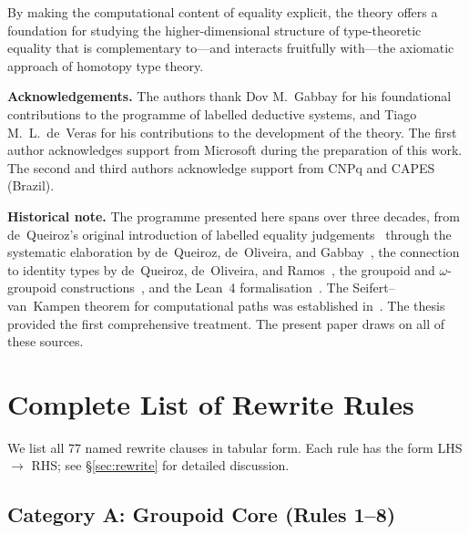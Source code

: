 \documentclass[manuscript]{BSLstyle}
\begin{document}
By making the computational content of equality explicit, the theory
offers a foundation for studying the higher-dimensional structure of
type-theoretic equality that is complementary to---and interacts
fruitfully with---the axiomatic approach of homotopy type theory.

\bigskip

\noindent
\textbf{Acknowledgements.}
The authors thank Dov M.~Gabbay for his foundational contributions to
the programme of labelled deductive systems, and Tiago M.~L.~de~Veras
for his contributions to the development of the theory.  The first
author acknowledges support from Microsoft during the preparation of
this work.  The second and third authors acknowledge support from
CNPq and CAPES (Brazil).

\bigskip

\noindent\textbf{Historical note.}
The programme presented here spans over three decades, from
de~Queiroz's original introduction of labelled equality
judgements~\cite{deQueiroz88:dialectica} through the systematic
elaboration by de~Queiroz, de~Oliveira, and
Gabbay~\cite{GabbaydeQueiroz92:c-h:full,deQueiroz94,deOliveiraDeQueiroz99,deOliveiraDeQueiroz05,deQueiroz2011},
the connection to identity types by de~Queiroz, de~Oliveira, and
Ramos~\cite{deQueirozDeOliveiraRamos2016,RamosDeQueirozDeOliveira2017},
the groupoid and $\omega$-groupoid
constructions~\cite{RamosDeQueirozDeOliveira2015,deVerasRamosDeQueirozDeOliveira2023,RamosDeVerasDeQueirozDeOliveira2025omega},
and the Lean~4
formalisation~\cite{RamosDeOliveiraDeQueirozDeVeras2025lean,RamosDeOliveiraDeQueirozDeVeras2025lean4}.
The Seifert--van~Kampen theorem for computational paths was established
in~\cite{RamosDeVerasDeQueirozDeOliveira2025svk}.
The thesis~\cite{Ramos2019thesis} provided the first comprehensive
treatment.  The present paper draws on all of these sources.

\bigskip

\appendix
\section{Complete List of Rewrite Rules}\label{app:rules}

We list all 77 named rewrite clauses in tabular form.  Each rule has
the form LHS $\to$ RHS; see \S\ref{sec:rewrite} for detailed discussion.

\subsection*{Category A: Groupoid Core (Rules 1--8)}
\end{document}
